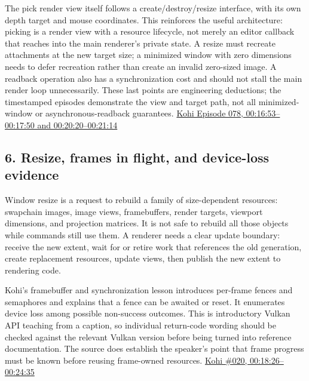 The pick render view itself follows a create/destroy/resize interface, with its own depth target and mouse coordinates. This reinforces the useful architecture: picking is a render view with a resource lifecycle, not merely an editor callback that reaches into the main renderer's private state. A resize must recreate attachments at the new target size; a minimized window with zero dimensions needs to defer recreation rather than create an invalid zero-sized image. A readback operation also has a synchronization cost and should not stall the main render loop unnecessarily. These last points are engineering deductions; the timestamped episodes demonstrate the view and target path, not all minimized-window or asynchronous-readback guarantees. \href{https://www.youtube.com/watch?v=mx1TyxNFrdo&t=16m53s}{Kohi Episode 078, 00:16:53--00:17:50 and 00:20:20--00:21:14}

\subsection{6. Resize, frames in flight, and device-loss evidence}\label{06-engine-ii-ch041-resize-frames-in-flight-and-device-loss-evidence}

Window resize is a request to rebuild a family of size-dependent resources: swapchain images, image views, framebuffers, render targets, viewport dimensions, and projection matrices. It is not safe to rebuild all those objects while commands still use them. A renderer needs a clear update boundary: receive the new extent, wait for or retire work that references the old generation, create replacement resources, update views, then publish the new extent to rendering code.

Kohi's framebuffer and synchronization lesson introduces per-frame fences and semaphores and explains that a fence can be awaited or reset. It enumerates device loss among possible non-success outcomes. This is introductory Vulkan API teaching from a caption, so individual return-code wording should be checked against the relevant Vulkan version before being turned into reference documentation. The source does establish the speaker's point that frame progress must be known before reusing frame-owned resources. \href{https://www.youtube.com/watch?v=Is6CwlsaCFE&t=18m26s}{Kohi \#020, 00:18:26--00:24:35}

